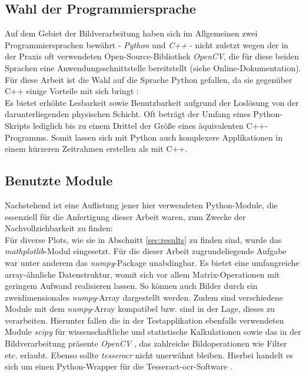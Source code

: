 		\subsection{Wahl der Programmiersprache}
		\label{sub:prog-lang}
			Auf dem Gebiet der Bildverarbeitung haben sich im Allgemeinen zwei Programmiersprachen bewährt - \textit{Python} und \textit{C++} - nicht zuletzt wegen der in der Praxis oft verwendeten Open-Source-Bibliothek \textit{OpenCV}, die für diese beiden Sprachen eine Anwendungsschnittstelle bereitstellt (siehe Online-Dokumentation). Für diese Arbeit ist die Wahl auf die Sprache Python gefallen, da sie gegenüber C++ einige Vorteile mit sich bringt \cite[S. 21f]{python-book}:\\
			Es bietet erhöhte Lesbarkeit sowie Benutzbarkeit aufgrund der Loslösung von der darunterliegenden physischen Schicht. Oft beträgt der Umfang eines Python-Skripts lediglich bis zu einem Drittel der Größe eines äquivalenten C++-Programms. Somit lassen sich mit Python auch komplexere Applikationen in einem kürzeren Zeitrahmen erstellen als mit C++. 

		\subsection{Benutzte Module}
		\label{sub:used-modules}
			Nachstehend ist eine Auflistung jener hier verwendeten Python-Module, die essenziell für die Anfertigung dieser Arbeit waren, zum Zwecke der Nachvollziehbarkeit zu finden:\\
			Für diverse Plots, wie sie in Abschnitt \ref{sec:results} zu finden sind, wurde das \textit{mathplotlib}-Modul \cite[Version 3.1.0]{hunter2007matplotlib} eingesetzt. Für die dieser Arbeit zugrundeliegende Aufgabe war unter anderem das \textit{numpy}-Package \cite[Version 1.16.4]{oliphant2006guide} unabdingbar. Es bietet eine umfangreiche array-ähnliche Datenstruktur, womit sich vor allem Matrix-Operationen mit geringem Aufwand realisieren lassen. So können auch Bilder durch ein zweidimensionales \textit{numpy}-Array dargestellt werden. Zudem sind verschiedene Module mit dem \textit{numpy}-Array kompatibel bzw. sind in der Lage, dieses zu verarbeiten. Hierunter fallen die in der Testapplikation ebenfalls verwendeten Module \textit{scipy} für wissenschaftliche und statistische Kalkulationen \cite[Version 1.2.1]{scipy} sowie das in der Bildverarbeitung präsente \textit{OpenCV} \cite{2014opencv}, das zahlreiche Bildoperationen wie Filter etc. erlaubt. Ebenso sollte \textit{tesserocr} nicht unerwähnt bleiben. Hierbei handelt es sich um einen Python-Wrapper für die Tesseract-\gls{ocr}-Software \cite{tesseract}.
			
